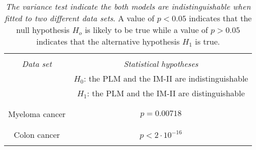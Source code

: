 \begin{table}[htbp!]
  \begin{center}
    \caption[The variance test suggests that both models are indistinguishable when fitted to two different data sets.]{\textit{The variance test indicate the both models are indistinguishable when fitted to two different data sets}.  A value of $p<0.05$ indicates that the null hypothesis $H_o$ is likely to be true while a value of $p>0.05$ indicates that the alternative hypothesis $H_1$ is true. }
    \begin{tabular}{||c|c||}
\hline\hline
      &  \\
      \textit{Data set} & \textit{Statistical hypotheses}\\
      & $H_0$: the PLM and the IM-II are indistinguishable \\
      & $H_1$: the PLM and the IM-II are distinguishable \\
      &  \\
      \hline\hline
      &  \\
      Myeloma cancer  & $p=0.00718$\\
      &  \\
      \hline
      &  \\
      Colon cancer & $p<2\cdot 10^{-16}$ \\
      &  \\
      \hline
      \hline\hline
      \end{tabular}
\label{tab:variance_test}
\end{center}
 \end{table}
